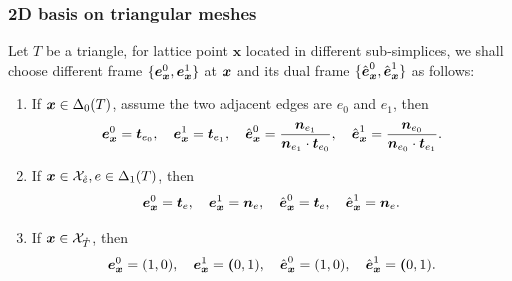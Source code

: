 \documentclass[mathpazo]{cicp}
\begin{document}
\subsubsection{2D basis on triangular meshes}
Let $T$ be a triangle, for lattice point $\boldsymbol{x}$ located in different sub-simplices, %
we shall choose different frame $\{\boldsymbol e_{\boldsymbol x}^0, \boldsymbol e_{\boldsymbol x}^1\}$ 
at $\boldsymbol x$ and its dual frame 
$\{\hat {\boldsymbol e}_{\boldsymbol x}^0, \hat{\boldsymbol e}_{\boldsymbol x}^1\}$ 
as follows:
\begin{enumerate}
  \item If $\boldsymbol x \in \Delta_0(T)$, assume the two adjacent edges are $e_0$ 
    and $e_1$, then
  $$
  \boldsymbol e_{\boldsymbol x}^0 = \boldsymbol t_{e_0}, \quad 
  \boldsymbol e_{\boldsymbol x}^1 = \boldsymbol t_{e_1}, \quad
  \hat{\boldsymbol e}_{\boldsymbol x}^0 = \frac{\boldsymbol n_{e_1}}{\boldsymbol n_{e_1} 
  \cdot \boldsymbol t_{e_0}},
   \quad 
  \hat{\boldsymbol e}_{\boldsymbol x}^1 = \frac{\boldsymbol n_{e_0}}{\boldsymbol n_{e_0} 
  \cdot \boldsymbol t_{e_1}}.
  $$
  \item If $\boldsymbol x \in \mathcal X_{\mathring{e}}, e \in \Delta_1(T)$, 
    then
  $$
  \boldsymbol e_{\boldsymbol x}^0 = \boldsymbol t_{e}, \quad \boldsymbol e_{\boldsymbol x}^1 = \boldsymbol n_{e}, \quad	
  \hat{\boldsymbol e}_{\boldsymbol x}^0 = \boldsymbol t_{e}, \quad \hat{\boldsymbol e}_{\boldsymbol x}^1 = \boldsymbol n_{e}.	
  $$  
  \item If $\boldsymbol x \in \mathcal X_{\mathring{T}}$, then
  $$
  \boldsymbol e_{\boldsymbol x}^0 = (1, 0), \quad \boldsymbol e_{\boldsymbol x}^1 = \boldsymbol (0, 1), \quad
  \hat{\boldsymbol e}_{\boldsymbol x}^0 = (1, 0), \quad \hat{\boldsymbol e}_{\boldsymbol x}^1 = \boldsymbol (0, 1).
  $$		
\end{enumerate}

\end{document}
